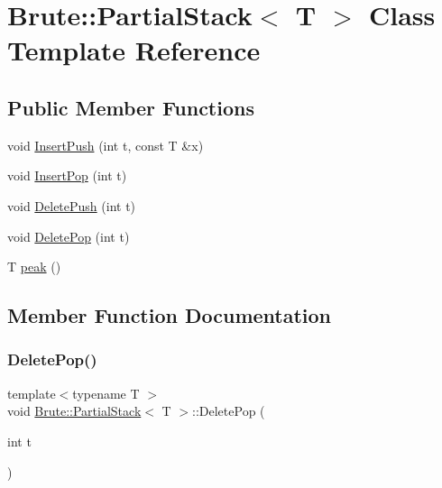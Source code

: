 \hypertarget{classBrute_1_1PartialStack}{}\section{Brute\+:\+:Partial\+Stack$<$ T $>$ Class Template Reference}
\label{classBrute_1_1PartialStack}
\subsection*{Public Member Functions}
\begin{DoxyCompactItemize}
\item 
void \hyperlink{classBrute_1_1PartialStack_a9b35f39e3d2a3b6af1599dfe8a9dc83d}{Insert\+Push} (int t, const T \&x)
\item 
void \hyperlink{classBrute_1_1PartialStack_a347ebf205dac4ad1976180b1ec897af8}{Insert\+Pop} (int t)
\item 
void \hyperlink{classBrute_1_1PartialStack_af872304f5d93e50b1e704dc8f6b13d34}{Delete\+Push} (int t)
\item 
void \hyperlink{classBrute_1_1PartialStack_a345e85a410547bd21dffe1bb05879c49}{Delete\+Pop} (int t)
\item 
T \hyperlink{classBrute_1_1PartialStack_a75cea8d95032298fabb08de150190045}{peak} ()
\end{DoxyCompactItemize}


\subsection{Member Function Documentation}
\mbox{\label{classBrute_1_1PartialStack_a345e85a410547bd21dffe1bb05879c49}} 
\subsubsection{\texorpdfstring{Delete\+Pop()}{DeletePop()}}
{\footnotesize\ttfamily template$<$typename T $>$ \\
void \hyperlink{classBrute_1_1PartialStack}{Brute\+::\+Partial\+Stack}$<$ T $>$\+::Delete\+Pop (\begin{DoxyParamCaption}\item[{int}]{t }\end{DoxyParamCaption})}

